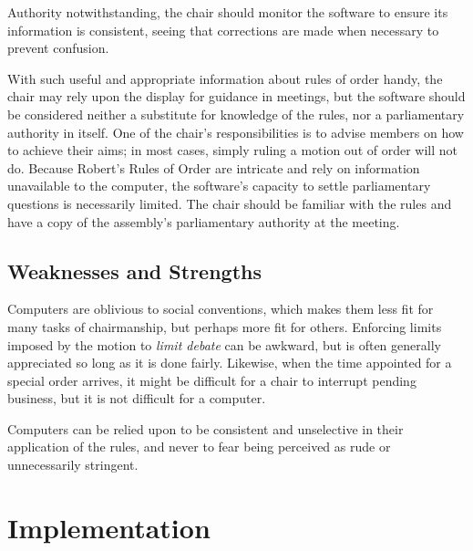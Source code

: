 \documentclass{acm_proc_article-sp}
\begin{document}
   
Authority notwithstanding, the chair should monitor the software to ensure its information is consistent, seeing that corrections are made when necessary to prevent confusion.

With such useful and appropriate information about rules of order handy, the chair may rely upon the display for guidance in meetings, but the software should be considered neither a substitute for knowledge of the rules, nor a parliamentary authority in itself. One of the chair's responsibilities is to advise members on how to achieve their aims; in most cases, simply ruling a motion out of order will not do. Because Robert's Rules of Order are intricate and rely on information unavailable to the computer, the software's capacity to settle parliamentary questions is necessarily limited. The chair should be familiar with the rules and have a copy of the assembly's parliamentary authority at the meeting.

\subsection{Weaknesses and Strengths}


Computers are oblivious to social conventions, which makes them less fit for many tasks of chairmanship, but perhaps more fit for others. Enforcing limits imposed by the motion to \emph{limit debate} can be awkward, but is often generally appreciated so long as it is done fairly. Likewise, when the time appointed for a special order arrives, it might be difficult for a chair to interrupt pending business, but it is not difficult for a computer.

Computers can be relied upon to be consistent and unselective in their application of the rules, and never to fear being perceived as rude or unnecessarily stringent.

\section{Implementation}  %
\label{sec:implementation}

\end{document}
